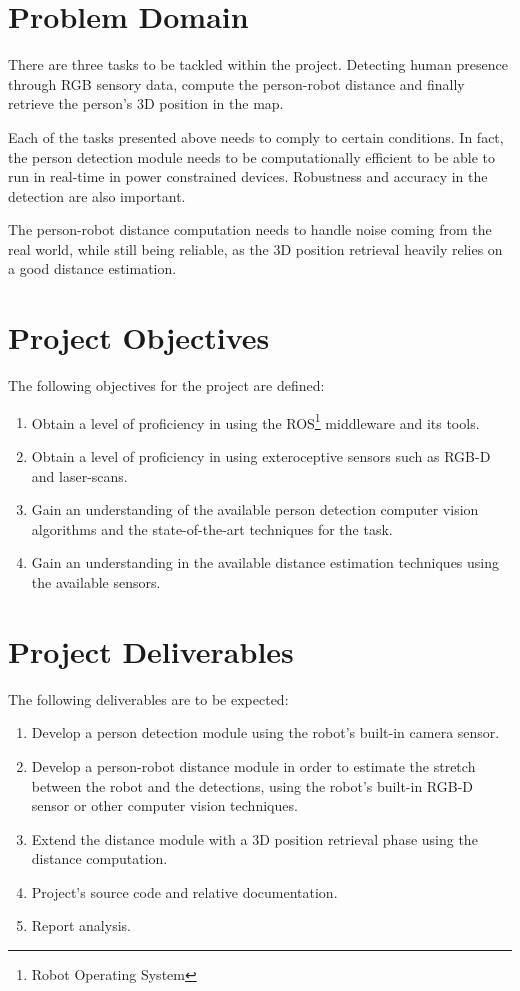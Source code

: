 \section{Problem Domain}

There are three tasks to be tackled within the project. Detecting human presence through RGB sensory data, compute the person-robot distance and finally retrieve the person's 3D position in the map.

Each of the tasks presented above needs to comply to certain conditions. In fact, the person detection module needs to be computationally efficient to be able to run in real-time in power constrained devices. Robustness and accuracy in the detection are also important.

The person-robot distance computation needs to handle noise coming from the real world, while still being reliable, as the 3D position retrieval heavily relies on a good distance estimation. 

\section{Project Objectives}

The following objectives for the project are defined:

\begin{enumerate}
  \item Obtain a level of proficiency in using the ROS\footnote{Robot Operating
System} middleware and its tools.
	\item Obtain a level of proficiency in using exteroceptive sensors such as RGB-D and laser-scans.
  \item Gain an understanding of the available person detection computer vision algorithms and the state-of-the-art techniques for the task.
  \item Gain an understanding in the available distance estimation techniques using the available sensors.
\end{enumerate}

\section{Project Deliverables}

The following deliverables are to be expected:

\begin{enumerate}
  \item Develop a person detection module using the robot's built-in camera sensor.
  \item Develop a person-robot distance module in order to estimate the stretch between the robot and the detections, using the robot's built-in RGB-D sensor or other computer vision techniques.
  \item Extend the distance module with a 3D position retrieval phase using the distance computation.
  \item Project's source code and relative documentation.
  \item Report analysis.
\end{enumerate}